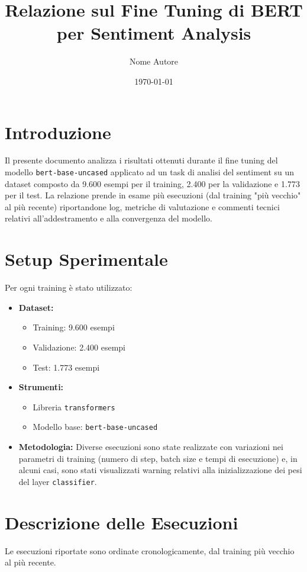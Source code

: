 \documentclass[a4paper,12pt]{article}
\title{Relazione sul Fine Tuning di BERT per Sentiment Analysis}
\author{Nome Autore}
\date{\today}
\begin{document}
\maketitle

\section{Introduzione}
Il presente documento analizza i risultati ottenuti durante il fine tuning del modello \texttt{bert-base-uncased} applicato ad un task di analisi del sentiment su un dataset composto da 9.600 esempi per il training, 2.400 per la validazione e 1.773 per il test. La relazione prende in esame più esecuzioni (dal training "più vecchio" al più recente) riportandone log, metriche di valutazione e commenti tecnici relativi all'addestramento e alla convergenza del modello.

\section{Setup Sperimentale}
Per ogni training è stato utilizzato:
\begin{itemize}
    \item \textbf{Dataset:} 
    \begin{itemize}
        \item Training: 9.600 esempi
        \item Validazione: 2.400 esempi
        \item Test: 1.773 esempi
    \end{itemize}
    \item \textbf{Strumenti:} 
    \begin{itemize}
        \item Libreria \texttt{transformers}
        \item Modello base: \texttt{bert-base-uncased}
    \end{itemize}
    \item \textbf{Metodologia:} Diverse esecuzioni sono state realizzate con variazioni nei parametri di training (numero di step, batch size e tempi di esecuzione) e, in alcuni casi, sono stati visualizzati warning relativi alla inizializzazione dei pesi del layer \texttt{classifier}.
\end{itemize}

\section{Descrizione delle Esecuzioni}
Le esecuzioni riportate sono ordinate cronologicamente, dal training più vecchio al più recente.
\end{document}
